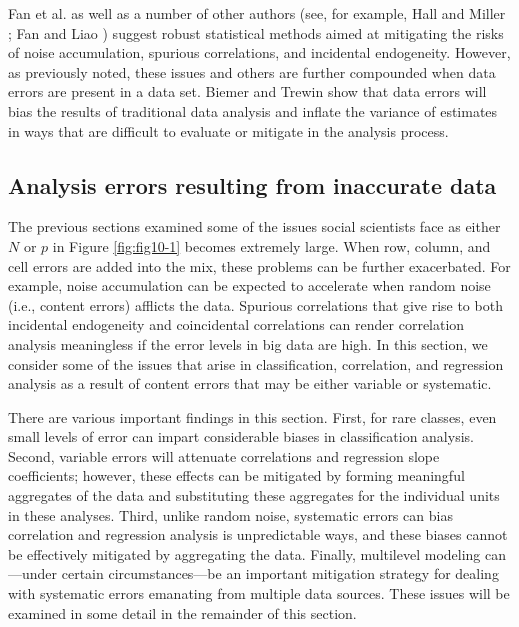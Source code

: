 \documentclass[]{krantz}
\begin{document}
Fan et al. \citeyearpar{fan2014challenges} as well as a number of other
authors \citep{stock2002forecasting, fan2009ultrahigh} (see, for
example, Hall and Miller \citet{HallMiller2009}; Fan and Liao
\citet{FanLiao2012}) suggest robust statistical methods aimed at
mitigating the risks of noise accumulation, spurious correlations, and
incidental endogeneity. However, as previously noted, these issues and
others are further compounded when data errors are present in a data
set. Biemer and Trewin \citeyearpar{biemer1997review} show that data
errors will bias the results of traditional data analysis and inflate
the variance of estimates in ways that are difficult to evaluate or
mitigate in the analysis process.

\subsection{Analysis errors resulting from inaccurate
data}\label{sec:10-4.2}

The previous sections examined some of the issues social scientists face
as either \(N\) or \(p\) in Figure \ref{fig:fig10-1} becomes extremely
large. When row, column, and cell errors are added into the mix, these
problems can be further exacerbated. For example, noise accumulation can
be expected to accelerate when random noise (i.e., content errors)
afflicts the data. Spurious correlations that give rise to both
incidental endogeneity and coincidental correlations can render
correlation analysis meaningless if the error levels in big data are
high. In this section, we consider some of the issues that arise in
classification, correlation, and regression analysis as a result of
content errors that may be either variable or systematic.

There are various important findings in this section. First, for rare
classes, even small levels of error can impart considerable biases in
classification analysis. Second, variable errors will attenuate
correlations and regression slope coefficients; however, these effects
can be mitigated by forming meaningful aggregates of the data and
substituting these aggregates for the individual units in these
analyses. Third, unlike random noise, systematic errors can bias
correlation and regression analysis is unpredictable ways, and these
biases cannot be effectively mitigated by aggregating the data. Finally,
multilevel modeling can---under certain circumstances---be an important
mitigation strategy for dealing with systematic errors emanating from
multiple data sources. These issues will be examined in some detail in
the remainder of this section.
\end{document}
